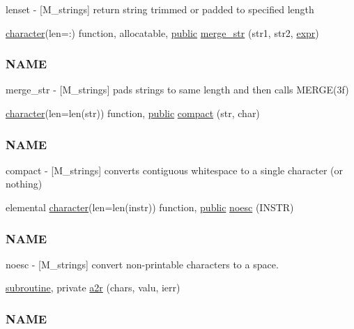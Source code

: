 \begin{DoxyCompactItemize}
\begin{DoxyCompactList}
lenset -\/ \mbox{[}M\+\_\+strings\mbox{]} return string trimmed or padded to specified length \end{DoxyCompactList}\item 
\hyperlink{option__stopwatch_83_8txt_abd4b21fbbd175834027b5224bfe97e66}{character}(len=\+:) function, allocatable, \hyperlink{M__stopwatch_83_8txt_a2f74811300c361e53b430611a7d1769f}{public} \hyperlink{namespacem__strings_aba5a8d7fc092b38d1939f37a13247c1e}{merge\+\_\+str} (str1, str2, \hyperlink{do_87_8txt_a74df008f496b23fc41b7a113e6fc2270}{expr})
\begin{DoxyCompactList}\small\item\em \subsubsection*{N\+A\+ME}

merge\+\_\+str -\/ \mbox{[}M\+\_\+strings\mbox{]} pads strings to same length and then calls M\+E\+R\+G\+E(3f) \end{DoxyCompactList}\item 
\hyperlink{option__stopwatch_83_8txt_abd4b21fbbd175834027b5224bfe97e66}{character}(len=len(str)) function, \hyperlink{M__stopwatch_83_8txt_a2f74811300c361e53b430611a7d1769f}{public} \hyperlink{namespacem__strings_a929c032267cb990ad4991fab4aed1d57}{compact} (str, char)
\begin{DoxyCompactList}\small\item\em \subsubsection*{N\+A\+ME}

compact -\/ \mbox{[}M\+\_\+strings\mbox{]} converts contiguous whitespace to a single character (or nothing) \end{DoxyCompactList}\item 
elemental \hyperlink{option__stopwatch_83_8txt_abd4b21fbbd175834027b5224bfe97e66}{character}(len=len(instr)) function, \hyperlink{M__stopwatch_83_8txt_a2f74811300c361e53b430611a7d1769f}{public} \hyperlink{namespacem__strings_a5d72fde097444c689f1822c5ad95e03d}{noesc} (I\+N\+S\+TR)
\begin{DoxyCompactList}\small\item\em \subsubsection*{N\+A\+ME}

noesc -\/ \mbox{[}M\+\_\+strings\mbox{]} convert non-\/printable characters to a space. \end{DoxyCompactList}\item 
\hyperlink{M__stopwatch_83_8txt_acfbcff50169d691ff02d4a123ed70482}{subroutine}, private \hyperlink{namespacem__strings_a6b4babf586dc3586426b13e4bb0fb979}{a2r} (chars, valu, ierr)
\begin{DoxyCompactList}\small\item\em \subsubsection*{N\+A\+ME}


\end{DoxyCompactList}
\end{DoxyCompactItemize}
